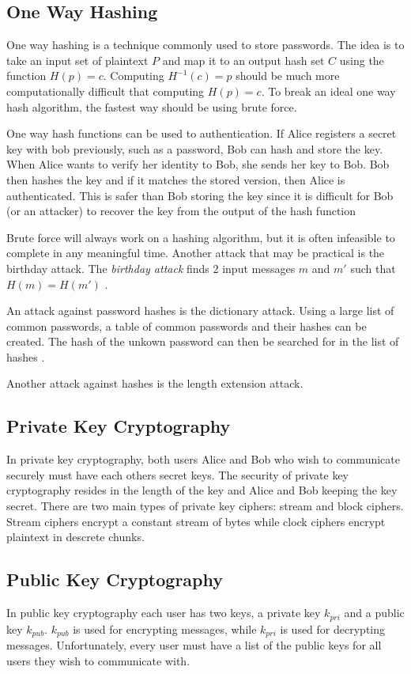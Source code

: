 \documentclass[12pt]{article}
\begin{document}
\subsection{One Way Hashing}
One way hashing is a technique commonly used to store passwords. The idea is to take an input set of plaintext $P$ and map it to an output hash set $C$ using the function $H(p)=c$. Computing $H^{-1}(c)=p$ should be much more computationally difficult that computing $H(p)=c$. To break an ideal one way hash algorithm, the fastest way should be using brute force.

One way hash functions can be used to authentication. If Alice registers a secret key with bob previously, such as a password, Bob can hash and store the key. When Alice wants to verify her identity to Bob, she sends her key to Bob. Bob then hashes the key and if it matches the stored version, then Alice is authenticated. This is safer than Bob storing the key since it is difficult for Bob (or an attacker) to recover the key from the output of the hash function \cite[pg. 52]{appcrypt}

Brute force will always work on a hashing algorithm, but it is often infeasible to complete in any meaningful time. Another attack that may be practical is the birthday attack. The \textit{birthday attack} finds 2 input messages $m$ and $m'$ such that $H(m)=H(m')$ \cite{appcrypt}.

An attack against password hashes is the dictionary attack. Using a large list of common passwords, a table of common passwords and their hashes can be created. The hash of the unkown password can then be searched for in the list of hashes \cite[pg. 52]{appcrypt}.

Another attack against hashes is the length extension attack. 

\subsection{Private Key Cryptography}
In private key cryptography, both users Alice and Bob who wish to communicate securely must have each others secret keys. The security of private key cryptography resides in the length of the key and Alice and Bob keeping the key secret. There are two main types of private key ciphers: stream and block ciphers. Stream ciphers encrypt a constant stream of bytes while clock ciphers encrypt plaintext in descrete chunks.

\subsection{Public Key Cryptography}
In public key cryptography each user has two keys, a private key $k_{pri}$ and a public key $k_{pub}$. $k_{pub}$ is used for encrypting messages, while $k_{pri}$ is used for decrypting messages. Unfortunately, every user must have a list of the public keys for all users they wish to communicate with.
\end{document}
